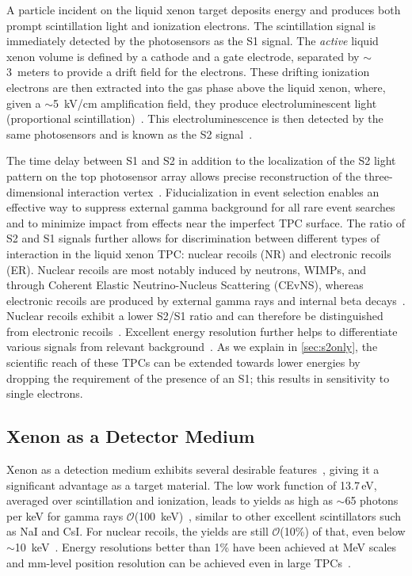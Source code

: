 A particle incident on the liquid xenon target deposits energy and produces both prompt scintillation light and ionization electrons. The scintillation signal is immediately detected by the photosensors as the S1 signal. The \textit{active} liquid xenon volume is defined by a cathode and a gate electrode, separated by $\sim$3~meters to provide a drift field for the electrons. These drifting ionization electrons are then extracted into the gas phase above the liquid xenon, where, given a $\sim$5~kV/cm amplification field, they produce electroluminescent light (proportional scintillation)~\cite{Lansiart:1976}. This electroluminescence is then detected by the same photosensors and is known as the S2 signal~\cite{Yamashita:2003rc,Aprile:2004ey, Mount:2017qzi}.

The time delay between S1 and S2 in addition to the localization of the S2 light pattern on the top photosensor array allows precise reconstruction of the three-dimensional interaction vertex~\cite{Angle:2006rj}. Fiducialization in event selection enables an effective way to suppress external gamma background for all rare event searches and to minimize impact from effects near the imperfect TPC surface. The ratio of S2 and S1 signals further allows for discrimination between different types of interaction in the liquid xenon TPC: nuclear recoils (NR) and electronic recoils (ER). Nuclear recoils are most notably induced by neutrons, WIMPs, and through Coherent Elastic Neutrino-Nucleus Scattering (CEvNS), whereas electronic recoils are produced by external gamma rays and internal beta decays~\cite{Aprile:2005mz,Akerib:2020lkv}. Nuclear recoils exhibit a lower S2/S1 ratio and can therefore be distinguished from electronic recoils~\cite{Akerib:2020lkv}. Excellent energy resolution further helps to differentiate various signals from relevant background~\cite{XENON:2020iwh}. As we explain in \autoref{sec:s2only}, the scientific reach of these TPCs can be extended towards lower energies by dropping the requirement of the presence of an S1; this results in sensitivity to single electrons.

\subsection{Xenon as a Detector Medium}\label{sec:detector_medium}

Xenon as a detection medium exhibits several desirable features~\cite{Aprile:2008bga}, giving it a significant advantage as a target material. The low work function of 13.7\,eV, averaged over scintillation and ionization, leads to yields as high as $\sim$65 photons per keV for gamma rays $\mathcal{O}$(100~keV)~\cite{Lenardo:2014cva}, similar to other excellent scintillators such as NaI and CsI. For nuclear recoils, the yields are still $\mathcal{O}$(10\%) of that, even below $\sim$10~keV~\cite{Aprile:2018jvg,PandaX-II:2021jmq}. Energy resolutions better than 1\% have been achieved at MeV scales~\cite{XENON:2020iwh} and mm-level position resolution can be achieved even in large TPCs~\cite{Solovov:2011aa,Aprile:2012vw,Baudis:2020nwe}. 

